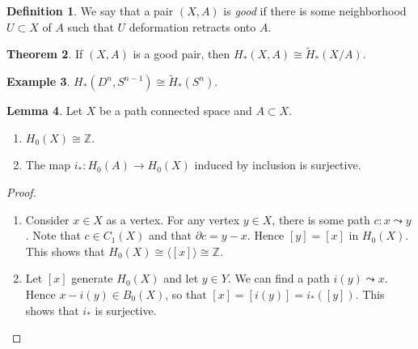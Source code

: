 \documentclass[10pt,letterpaper,cm]{nupset}
\theoremstyle{definition}
\newtheorem{definition}{Definition}[subsection]
\newtheorem{exmp}[definition]{Example}
\theoremstyle{theorem}
\newtheorem{theorem}[definition]{Theorem}
\newtheorem{lemma}[definition]{Lemma}
\theoremstyle{remark}
\newcommand{\Z}{\mathbb Z}
\newcommand{\1}{\mathbb{1}}
\newcommand{\0}{\vec 0}
\begin{document}
\begin{definition}
We say that a pair $(X, A)$ is \textit{good} if there is some neighborhood $U\subset X$ of $A$ such that $U$ deformation retracts onto $A$.
\end{definition}

\begin{theorem}
If $(X,A)$ is a good pair, then $H_{\ast}(X,A) \cong \widetilde{H}_{\ast}(X/A)$.
\end{theorem}

\begin{exmp}
$H_{\ast}(D^n, S^{n-1}) \cong \widetilde{H}_{\ast}(S^n)$.
\end{exmp}

\begin{lemma}\label{l21} Let $X$ be a path connected space and $A\subset X$.
\begin{enumerate}
\item $H_0(X) \cong \Z$.
\item The map $i_{\ast}: H_0(A) \to H_0(X)$ induced by inclusion is surjective. 
\end{enumerate}
\end{lemma}
\begin{proof} $ $
\begin{enumerate} 
\item Consider $x\in X$ as a vertex. For any vertex $y\in X$, there is some path $c: x\leadsto y$. Note that $c \in C_1(X)$ and that $\partial{c}= y-x$. Hence $[y]= [x]$ in $H_0(X)$. This shows that $H_0(X) \cong \langle [x] \rangle \cong \Z$.
\item Let $[x]$ generate $H_0(X)$ and let $y\in Y$. We can find a path $i(y) \leadsto x$. Hence $x-i(y)\in B_0(X)$, so that $[x] =[i(y)]= i_{\ast}([y])$. This shows that $i_{\ast}$ is surjective.
\end{enumerate}
\end{proof}
\end{document}

